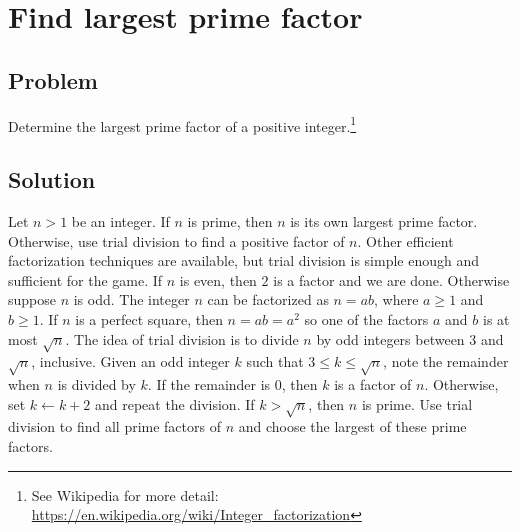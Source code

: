 
\section{Find largest prime factor}



\subsection*{Problem}

Determine the largest prime factor of a positive integer.\footnote{
  See Wikipedia for more detail:
  \url{https://en.wikipedia.org/wiki/Integer_factorization}
}



\subsection*{Solution}

Let $n > 1$ be an integer.  If $n$ is prime, then $n$ is its own
largest prime factor.  Otherwise, use trial division to find a
positive factor of $n$.  Other efficient factorization techniques are
available, but trial division is simple enough and sufficient for the
game.  If $n$ is even, then $2$ is a factor and we are done.
Otherwise suppose $n$ is odd.  The integer $n$ can be factorized as
$n = ab$, where $a \geq 1$ and $b \geq 1$.  If $n$ is a perfect
square, then $n = ab = a^2$ so one of the factors $a$ and $b$ is at
most $\sqrt{n}$.  The idea of trial division is to divide $n$ by odd
integers between $3$ and $\sqrt{n}$, inclusive.  Given an odd integer
$k$ such that $3 \leq k \leq \sqrt{n}$, note the remainder when $n$ is
divided by $k$.  If the remainder is $0$, then $k$ is a factor of $n$.
Otherwise, set $k \gets k + 2$ and repeat the division.  If
$k > \sqrt{n}$, then $n$ is prime.  Use trial division to find all
prime factors of $n$ and choose the largest of these prime factors.
